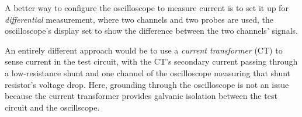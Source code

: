 \vskip 10pt

A better way to configure the oscilloscope to measure current is to set it up for {\it differential} measurement, where two channels and two probes are used, the oscilloscope's display set to show the difference between the two channels' signals.

\vskip 10pt

An entirely different approach would be to use a {\it current transformer} (CT) to sense current in the test circuit, with the CT's secondary current passing through a low-resistance shunt and one channel of the oscilloscope measuring that shunt resistor's voltage drop.  Here, grounding through the oscilloscope is not an issue because the current transformer provides galvanic isolation between the test circuit and the oscillscope.











